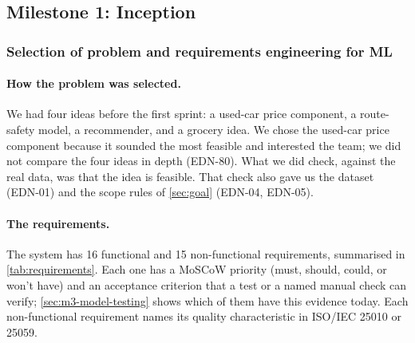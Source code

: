 \subsection{Milestone 1: Inception}
\label{sec:m1}

\subsubsection{Selection of problem and requirements engineering for ML}
\label{sec:m1-requirements}

\paragraph{How the problem was selected.}
We had four ideas before the first sprint: a used-car price component, a route-safety model, a recommender, and a grocery idea.
We chose the used-car price component because it sounded the most feasible and interested the team; we did not compare the four ideas in depth (EDN-80).
What we did check, against the real data, was that the idea is feasible.
That check also gave us the dataset (EDN-01) and the scope rules of \cref{sec:goal} (EDN-04, EDN-05).

\paragraph{The requirements.}
The system has 16 functional and 15 non-functional requirements, summarised in \cref{tab:requirements}.
Each one has a MoSCoW priority (must, should, could, or won't have) and an acceptance criterion that a test or a named manual check can verify; \cref{sec:m3-model-testing} shows which of them have this evidence today.
Each non-functional requirement names its quality characteristic in ISO/IEC 25010 or 25059.

